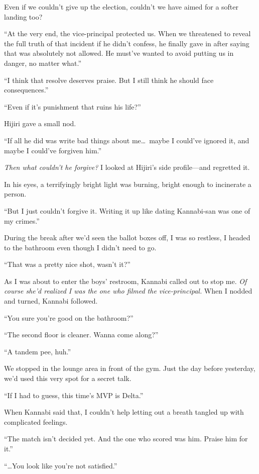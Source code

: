 \documentclass[
    a4paper,
    12pt,
    twoside,
    openany,
    UTF8,
    fontset=windows
]{ctexbook}
\begin{document}
Even if we couldn't give up the election, couldn't we have aimed for a softer landing too?

``At the very end, the vice-principal protected us. When we threatened to reveal the full truth of that incident if he didn't confess, he finally gave in after saying that was absolutely not allowed. He must've wanted to avoid putting us in danger, no matter what.''

``I think that resolve deserves praise. But I still think he should face consequences.''

``Even if it's punishment that ruins his life?''

Hijiri gave a small nod.

``If all he did was write bad things about me\dots\ maybe I could've ignored it, and maybe I could've forgiven him.''

\textit{Then what couldn't he forgive?} I looked at Hijiri's side profile---and regretted it.

In his eyes, a terrifyingly bright light was burning, bright enough to incinerate a person.

``But I just couldn't forgive it. Writing it up like dating Kannabi-san was one of my crimes.''

During the break after we'd seen the ballot boxes off, I was so restless, I headed to the bathroom even though I didn't need to go.

``That was a pretty nice shot, wasn't it?''

As I was about to enter the boys' restroom, Kannabi called out to stop me. \textit{Of course she'd realized I was the one who filmed the vice-principal.} When I nodded and turned, Kannabi followed.

``You sure you're good on the bathroom?''

``The second floor is cleaner. Wanna come along?''

``A tandem pee, huh.''

We stopped in the lounge area in front of the gym. Just the day before yesterday, we'd used this very spot for a secret talk.

``If I had to guess, this time's MVP is Delta.''

When Kannabi said that, I couldn't help letting out a breath tangled up with complicated feelings.

``The match isn't decided yet. And the one who scored was him. Praise him for it.''

``\dots You look like you're not satisfied.''
\end{document}
